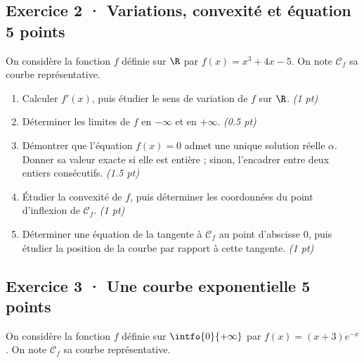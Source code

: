 \subsection*{Exercice 2 · Variations, convexité et équation \hfill 5 points}On considère la fonction $f$ définie sur $\R$ par $f(x)=x^3+4x-5$. On note $\mathcal C_f$ sa courbe représentative.

\begin{enumerate}

\item Calculer $f' (x)$, puis étudier le sens de variation de $f$ sur $\R$. \hfill\textit{(1 pt)}

\item Déterminer les limites de $f$ en $-\infty$ et en $+\infty$. \hfill\textit{(\num{0,5} pt)}

\item Démontrer que l'équation $f(x)=0$ admet une unique solution réelle $\alpha$. Donner sa valeur exacte si elle est entière ; sinon, l'encadrer entre deux entiers consécutifs. \hfill\textit{(\num{1,5} pt)}

\item Étudier la convexité de $f$, puis déterminer les coordonnées du point d'inflexion de $\mathcal C_f$. \hfill\textit{(1 pt)}

\item Déterminer une équation de la tangente à $\mathcal C_f$ au point d'abscisse $0$, puis étudier la position de la courbe par rapport à cette tangente. \hfill\textit{(1 pt)}

\end{enumerate}

\mxnewpage{}

\subsection*{Exercice 3 · Une courbe exponentielle \hfill 5 points}On considère la fonction $f$ définie sur $\intfo{0}{+\infty}$ par $f(x)=(x+3)e^{-x}$. On note $\mathcal C_f$ sa courbe représentative.

